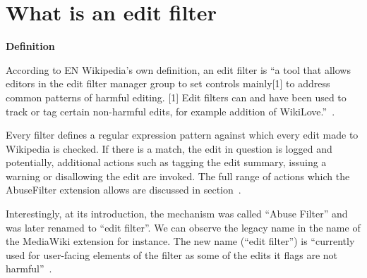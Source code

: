 \documentclass{sigchi}
\begin{document}

\section{What is an edit filter}

\textbf{Definition}

According to EN Wikipedia's own definition, an edit filter is ``a tool that allows editors in the edit filter manager group to set controls mainly[1] to address common patterns of harmful editing.
[1] Edit filters can and have been used to track or tag certain non-harmful edits, for example addition of WikiLove.''~\cite{Wikipedia:EditFilter}.

Every filter defines a regular expression pattern against which every edit made to Wikipedia is checked.
If there is a match, the edit in question is logged and potentially, additional actions such as tagging the edit summary, issuing a warning or disallowing the edit are invoked.
The full range of actions which the AbuseFilter extension allows are discussed in section~\label{sec:technical-layer}.

Interestingly, at its introduction, the mechanism was called ``Abuse Filter'' and was later renamed to ``edit filter''.
We can observe the legacy name in the name of the MediaWiki extension for instance.
The new name (``edit filter'') is ``currently used for user-facing elements of the filter as some of the edits it flags are not harmful''~\cite{Wikipedia:EditFilter}.
\end{document}
